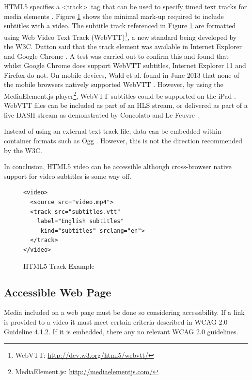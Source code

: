 \documentclass[journal]{IEEEtran}
\begin{document}
HTML5 specifies a \textless track\textgreater~tag that can be used to specify timed text tracks for media elements \cite{standard:html5}. Figure \ref{lst:trackExample} shows the minimal mark-up required to include subtitles with a video. The subtitle track referenced in Figure \ref{lst:trackExample} are formatted using Web Video Text Track (WebVTT)\footnote{WebVTT: \url{http://dev.w3.org/html5/webvtt/}}, a new standard being developed by the W3C. Dutton said that the track element was available in Internet Explorer and Google Chrome \cite{website:html5RocksTrackElement}. A test was carried out to confirm this and found that whilst Google Chrome does support WebVTT subtitles, Internet Explorer 11 and Firefox do not. On mobile devices, Wald et al. found in June 2013 that none of the mobile browsers natively supported WebVTT \cite{article:synote}. However, by using the MediaElement.js player\footnote{MediaElement.js: \url{http://mediaelementjs.com/}}, WebVTT subtitles could be supported on the iPad \cite{article:synote}. WebVTT files can be included as part of an HLS stream, or delivered as part of a live DASH stream as demonstrated by Concolato and Le Feuvre \cite{misc:HTTPLiveStreaming}\cite{inproceedings:liveHTTPSubtitle}.

Instead of using an external text track file, data can be embedded within container formats such as Ogg \cite{inproceedings:accessibilityForTheHTML5VideoElement}\cite{website:oggSubtitles}. However, this is not the direction recommended by the W3C. %

In conclusion, HTML5 video can be accessible although cross-browser native support for video subtitles is some way off.

\begin{figure}
\label{lst:trackExample}
\caption{HTML5 Track Example \cite{website:html5RocksTrackElement}}
\begin{lstlisting}[frame=single,language=HTML5]
<video>
  <source src="video.mp4">
  <track src="subtitles.vtt"
    label="English subtitles"
     kind="subtitles" srclang="en">
  </track>
</video>
\end{lstlisting}
\end{figure}

\subsection{Accessible Web Page}
Media included on a web page must be done so considering accessibility. If a link is provided to a video it must meet certain criteria described in WCAG 2.0 Guideline 4.1.2. If it is embedded, there any no relevant WCAG 2.0 guidelines.
\end{document}
